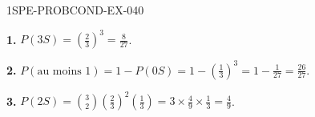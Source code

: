 \begin{corrige}{1SPE-PROBCOND-EX-040}

\textbf{1.} $P(3S) = \left(\frac{2}{3}\right)^3 = \frac{8}{27}$.

\textbf{2.} $P(\text{au moins 1}) = 1 - P(0S) = 1 - \left(\frac{1}{3}\right)^3 = 1 - \frac{1}{27} = \frac{26}{27}$.

\textbf{3.} $P(2S) = \binom{3}{2}\left(\frac{2}{3}\right)^2\left(\frac{1}{3}\right) = 3 \times \frac{4}{9} \times \frac{1}{3} = \frac{4}{9}$.

\end{corrige}
